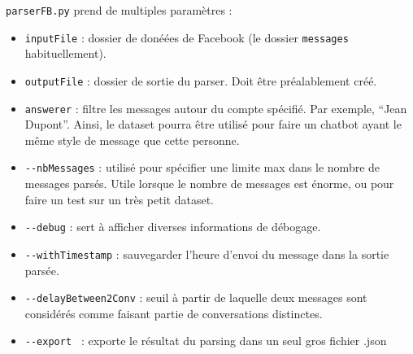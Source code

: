 \documentclass[10pt,a4paper]{article}
\begin{document}
\texttt{parserFB.py} prend de multiples paramètres :
\begin{itemize}
 \item \texttt{inputFile} : dossier de donéées de Facebook (le dossier \texttt{messages} habituellement).
 \item \texttt{outputFile} : dossier de sortie du parser. Doit être préalablement créé.
 \item \texttt{answerer} : filtre les messages autour du compte spécifié. Par exemple, ``Jean Dupont''. Ainsi, le dataset pourra être utilisé pour faire un chatbot ayant le même style de message que cette personne.
 \item \texttt{-{}-nbMessages} : utilisé pour spécifier une limite max dans le nombre de messages parsés. Utile lorsque le nombre de messages est énorme, ou pour faire un test sur un très petit dataset.
 \item \texttt{-{}-debug} : sert à afficher diverses informations de débogage.
 \item \texttt{-{}-withTimestamp} : sauvegarder l'heure d'envoi du message dans la sortie parsée.
 \item \texttt{-{}-delayBetween2Conv} : seuil à partir de laquelle deux messages sont considérés comme faisant partie de conversations distinctes.
 \item \texttt{-{}-export } : exporte le résultat du parsing dans un seul gros fichier .json
\end{itemize}
\end{document}
